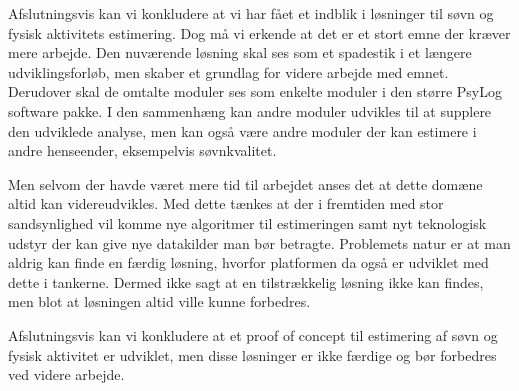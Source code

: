 Afslutningsvis kan vi konkludere at vi har fået et indblik i løsninger til søvn og fysisk aktivitets estimering.
Dog må vi erkende at det er et stort emne der kræver mere arbejde.
Den nuværende løsning skal ses som et spadestik i et længere udviklingsforløb, men skaber et grundlag for videre arbejde med emnet.
Derudover skal de omtalte moduler ses som enkelte moduler i den større PsyLog software pakke.
I den sammenhæng kan andre moduler udvikles til at supplere den udviklede analyse, men kan også være andre moduler der kan estimere i andre henseender, eksempelvis søvnkvalitet.


Men selvom der havde været mere tid til arbejdet anses det at dette domæne altid kan videreudvikles.
Med dette tænkes at der i fremtiden med stor sandsynlighed vil komme nye algoritmer til estimeringen samt nyt teknologisk udstyr der kan give nye datakilder man bør betragte.
Problemets natur er at man aldrig kan finde en færdig løsning, hvorfor platformen da også er udviklet med dette i tankerne.
Dermed ikke sagt at en tilstrækkelig løsning ikke kan findes, men blot at løsningen altid ville kunne forbedres.

Afslutningsvis kan vi konkludere at et proof of concept til estimering af søvn og fysisk aktivitet er udviklet, men disse løsninger er ikke færdige og bør forbedres ved videre arbejde.



